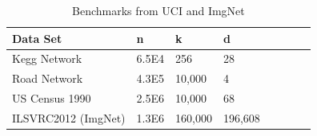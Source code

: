 \documentclass[10pt,journal,compsoc]{IEEEtran}
\begin{document}
{\begin{table}
  \caption{Benchmarks from UCI and ImgNet}
  \label{t1}
   \begin{tabular}{p{2.5cm} p{1.5cm} p{1.5cm}p{1.5cm} c c c c}
      \hline
    Data Set &n & k & d\\
       \hline
    Kegg Network &6.5E4 &256 &28  \\
    Road Network &4.3E5 &10,000 &4 \\
    US Census 1990 &2.5E6 &10,000 &68 \\
    \hline
    ILSVRC2012 (ImgNet) &1.3E6 &160,000 &196,608 \\
    \hline
  \end{tabular}
\end{table}


}
\end{document}
